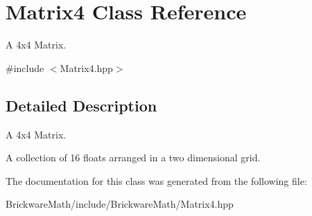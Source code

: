 \hypertarget{classMatrix4}{}\section{Matrix4 Class Reference}
\label{classMatrix4}


A 4x4 Matrix.  




{\ttfamily \#include $<$Matrix4.\+hpp$>$}



\subsection{Detailed Description}
A 4x4 Matrix. 

A collection of 16 floats arranged in a two dimensional grid. 

The documentation for this class was generated from the following file\+:\begin{DoxyCompactItemize}
\item 
Brickware\+Math/include/\+Brickware\+Math/Matrix4.\+hpp\end{DoxyCompactItemize}
